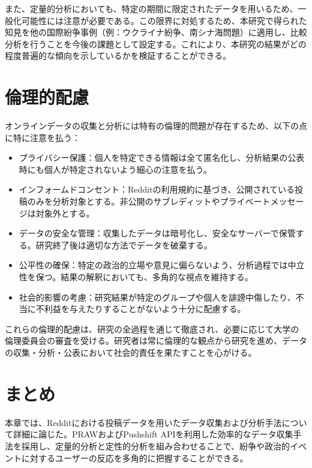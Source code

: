 \documentclass[11pt, a4j]{jreport}
\begin{document}
    また、定量的分析においても、特定の期間に限定されたデータを用いるため、一般化可能性には注意が必要である。この限界に対処するため、本研究で得られた知見を他の国際紛争事例（例：ウクライナ紛争、南シナ海問題）に適用し、比較分析を行うことを今後の課題として設定する。これにより、本研究の結果がどの程度普遍的な傾向を示しているかを検証することができる。

    \section{倫理的配慮}
    オンラインデータの収集と分析には特有の倫理的問題が存在するため、以下の点に特に注意を払う：

    \begin{itemize}
        \item プライバシー保護：個人を特定できる情報は全て匿名化し、分析結果の公表時にも個人が特定されないよう細心の注意を払う。

        \item インフォームドコンセント：Redditの利用規約に基づき、公開されている投稿のみを分析対象とする。非公開のサブレディットやプライベートメッセージは対象外とする。

        \item データの安全な管理：収集したデータは暗号化し、安全なサーバーで保管する。研究終了後は適切な方法でデータを破棄する。

        \item 公平性の確保：特定の政治的立場や意見に偏らないよう、分析過程では中立性を保つ。結果の解釈においても、多角的な視点を維持する。

        \item 社会的影響の考慮：研究結果が特定のグループや個人を誹謗中傷したり、不当に不利益を与えたりすることがないよう十分に配慮する。
    \end{itemize}

    これらの倫理的配慮は、研究の全過程を通じて徹底され、必要に応じて大学の倫理委員会の審査を受ける。研究者は常に倫理的な観点から研究を進め、データの収集・分析・公表において社会的責任を果たすことを心がける。

    \section{まとめ}
    本章では、Redditにおける投稿データを用いたデータ収集および分析手法について詳細に論じた。PRAWおよびPushshift
    APIを利用した効率的なデータ収集手法を採用し、定量的分析と定性的分析を組み合わせることで、紛争や政治的イベントに対するユーザーの反応を多角的に把握することができる。
\end{document}
